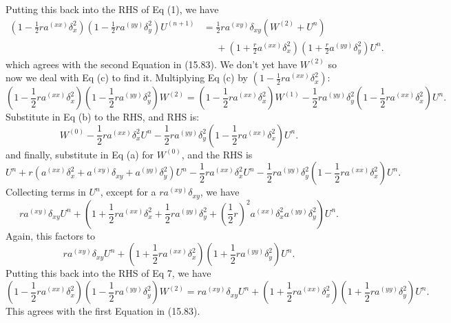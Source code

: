 \documentclass[11pt]{article}
\def\f{\frac }
\begin{document}
\begin{enumerate}
Putting this back into the RHS of Eq (1), we have
\begin{align*} \left ( 1 - \f{1}{2} r a ^{(xx)} \delta _x ^2 \right ) \left ( 1 - \f{1}{2} r a ^{(yy)} \delta _y ^2 \right ) U^{(n+1)} &= \f{1}{2} r a^{(xy)} \delta _{xy} \left ( W^{(2)} + U^n \right ) \\ & ~~~~~~+ \left ( 1 + \f{r}{2} a ^{(xx)} \delta _x ^ 2 \right ) \left (1 +  \f{r}{2}  a ^{(yy)} \delta _y ^ 2 \right ) U^n .\end{align*}
which agrees with the second Equation in (15.83).
We don't yet have $W^{(2)}$ so now we deal with Eq (c) to find it.
Multiplying Eq (c) by $\left ( 1 - \f{1}{2} r a ^{(xx)} \delta _x ^2 \right )$:
\begin{equation} \left ( 1 - \f{1}{2} r a ^{(xx)} \delta _x ^2 \right ) \left ( 1 - \f{1}{2} r a ^{(yy)} \delta _y ^2 \right ) W^{(2)} = \left ( 1 - \f{1}{2} r a ^{(xx)} \delta _x ^2 \right ) W^{(1)} - \f{1}{2} r a ^{(yy)} \delta _y ^ 2 \left ( 1 - \f{1}{2} r a ^{(xx)} \delta _x ^2 \right ) U^n.\end{equation}
Substitute in Eq (b) to the RHS, and RHS is:
\begin{equation}  W^{(0)} - \f{1}{2} r a ^{(xx)} \delta _x ^ 2 U^n - \f{1}{2} r a ^{(yy)} \delta _y ^ 2 \left ( 1 - \f{1}{2} r a ^{(xx)} \delta _x ^2 \right ) U^n.\end{equation}
and finally, substitute in Eq (a) for $W^{(0)}$, and the RHS is
\begin{equation}  U^n + r \left ( a ^{(xx)} \delta _x ^2 + a^{(xy)} \delta _{xy} + a ^{(yy)} \delta _y ^ 2 \right ) U^n - \f{1}{2} r a ^{(xx)} \delta _x ^ 2 U^n - \f{1}{2} r a ^{(yy)} \delta _y ^ 2 \left ( 1 - \f{1}{2} r a ^{(xx)} \delta _x ^2 \right ) U^n.\end{equation}
Collecting terms in $U^n$, except for a $r a^{(xy)} \delta _{xy}$, we have
\begin{equation}  r a^{(xy)} \delta _{xy} U^n + \left ( 1 + \f{1}{2} r a ^{(xx)} \delta _x ^ 2 + \f{1}{2} r a ^{(yy)} \delta _y ^ 2 +  \left ( \f{1}{2} r \right ) ^ 2 a ^{(xx)} \delta _x ^2 a ^{(yy)} \delta _y ^2 \right )  U^n.\end{equation}
Again, this factors to 
\begin{equation}  r a^{(xy)} \delta _{xy} U^n + \left ( 1 + \f{1}{2} r a ^{(xx)} \delta _x ^ 2 \right ) \left (  1 + \f{1}{2} r a ^{(yy)} \delta _y ^ 2 \right ) U^n.\end{equation}
Putting this back into the RHS of Eq 7, we have
\begin{equation} \left ( 1 - \f{1}{2} r a ^{(xx)} \delta _x ^2 \right ) \left ( 1 - \f{1}{2} r a ^{(yy)} \delta _y ^2 \right ) W^{(2)} = r a^{(xy)} \delta _{xy} U^n + \left ( 1 + \f{1}{2} r a ^{(xx)} \delta _x ^ 2 \right ) \left (  1 + \f{1}{2} r a ^{(yy)} \delta _y ^ 2 \right ) U^n.\end{equation}
This agrees with the first Equation in (15.83).


\end{enumerate}
\end{document}
